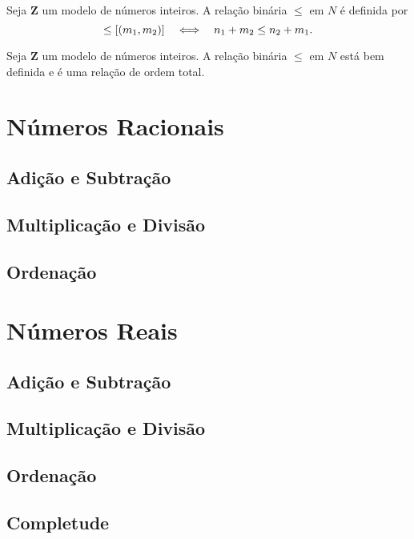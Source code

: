 \begin{defi}
	Seja $\bm Z$ um modelo de números inteiros. A relação binária $\leq$ em $N$ é definida por
	\begin{equation*}
	[(n_1,n_2)] \leq [(m_1,m_2)] \sse n_1+m_2 \leq n_2+m_1.
	\end{equation*}
\end{defi}

\begin{prop}
	Seja $\bm Z$ um modelo de números inteiros. A relação binária $\leq$ em $N$ está bem definida e é uma relação de ordem total.
\end{prop}


\section{Números Racionais}

\subsection{Adição e Subtração}

\subsection{Multiplicação e Divisão}

\subsection{Ordenação}


\section{Números Reais}

\subsection{Adição e Subtração}

\subsection{Multiplicação e Divisão}

\subsection{Ordenação}

\subsection{Completude}



